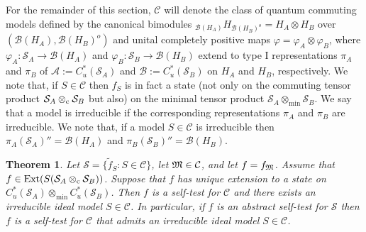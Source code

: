 \documentclass[11pt]{amsart}
\newtheorem{theorem}{Theorem}[section]
\theoremstyle{definition}
\newcommand{\cl}[1]{\mathcal{#1}}
\begin{document}
For the remainder of this section, 
$\cl C$ will denote the class of quantum commuting models defined by the canonical bimodules $_{\cl B(H_A)}H_{\cl B(H_B)^o}= H_A\otimes H_B$ over
$(\cl B(H_A), \cl B(H_B)^o)$ and 
unital completely positive maps
$\varphi = \varphi_A\otimes \varphi_B$, where 
$\varphi_A :\cl S_A \to \cl B(H_A)$ and 
$\varphi_B :\cl S_B \to \cl B(H_B)$ 
extend to type I representations $\pi_A$ and $\pi_B$ of $\cl A:=C_u^*(\cl S_A)$ and $\cl B:=C_u^*(\cl S_B)$ on $H_A$ and $H_B$, respectively. 
We note that, if $S\in \cl C$ then $f_S$ is in fact a state 
(not only on the commuting tensor product $\cl S_A\otimes_{\rm c}\cl S_B$
but also) on the minimal tensor product 
$\cl S_A\otimes_{\min}\cl S_B$.
We say that a model is irreducible if the corresponding 
representations $\pi_A$ and $\pi_B$ are irreducible.
We note that, if a model $S\in \cl C$ is irreducible then 
$\pi_A(\cl S_A)'' = \cl B(H_A)$ and $\pi_B(\cl S_B)'' = \cl B(H_B)$.


\begin{theorem}\label{th_rev}
Let $\cl S = \{\tilde{f}_S: S\in\cl C\}$, 
let $\frak{M}\in \cl C$, and let $f = f_{\frak{M}}$. 
Assume that
$f\in {\rm Ext}(S(\cl S_A\otimes_{\rm c}\cl S_B))$. 
Suppose that $f$ has unique extension to a state on 
$C^*_u(\cl S_A)\otimes_{\min} C^*_u(\cl S_B)$.
Then $f$ is a self-test for $\cl C$ and there exists an irreducible ideal model $S\in\cl C$.
In particular, if $f$ is an abstract self-test for $\cl S$ then 
$f$ is a self-test for $\cl C$ that admits an irreducible ideal model $S\in\cl C$.
\end{theorem}
\end{document}
